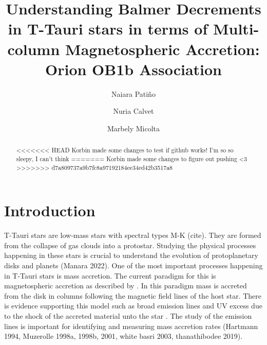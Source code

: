 \documentclass[twocolumn,linenumbers]{aastex631}
\begin{document}
\title{Understanding Balmer Decrements in T-Tauri stars in terms of Multi-column Magnetospheric Accretion: Orion OB1b Association}


\author[0009-0009-7455-6777]{Naiara Patiño}

\author[0000-0002-3950-5386]{Nuria Calvet}

\author[0000-0001-8022-4378]{Marbely Micolta}




\begin{abstract}

<<<<<<< HEAD
Korbin made some changes to test if github works!
I'm so so sleepy, I can't think
=======
Korbin made some changes to figure out pushing <3
>>>>>>> d7a809737a9b7fc8a97192184ee34ed42b3517a8
    
\end{abstract}


\section{Introduction}

T-Tauri stars are low-mass stars with spectral types M-K (cite). They are formed from the collapse of gas clouds into a protostar. Studying the physical processes happening in these stars is crucial to understand the evolution of protoplanetary disks and planets (Manara 2022). One of the most important processes happening in T-Tauri stars is mass accretion. The current paradigm for this is magnetospheric accretion as described by \citep{hartmann2016}. In this paradigm mass is accreted from the disk in columns following the magnetic field lines of the host star. There is evidence supporting this model such as broad emission lines \citep{muzerolle2001} and UV excess due to the shock of the accreted material unto the star \citep{calvet_gullbring1998}. The study of the emission lines is important for identifying and measuring mass accretion rates (Hartmann 1994, Muzerolle 1998a, 1998b, 2001, white basri 2003, thanathibodee 2019).
\end{document}

